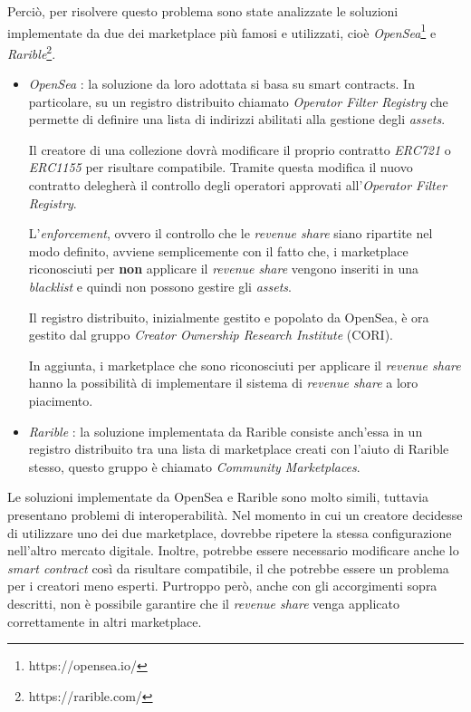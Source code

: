 Perciò, per risolvere questo problema sono state analizzate le soluzioni implementate da due dei marketplace più famosi e utilizzati, cioè \textit{OpenSea}\footnote{https://opensea.io/} e \textit{Rarible}\footnote{https://rarible.com/}.

\begin{itemize}
    \item \textit{OpenSea} \cite{operator-filter-registry}: la soluzione da loro adottata si basa su smart contracts.
    In particolare, su un registro distribuito chiamato \textit{Operator Filter Registry} che permette di definire una lista di indirizzi abilitati alla gestione degli \textit{assets}. 

    Il creatore di una collezione dovrà modificare il proprio contratto  \textit{ERC721} o \textit{ERC1155} per risultare compatibile. Tramite questa modifica il nuovo contratto delegherà il controllo degli operatori approvati all'\textit{Operator Filter Registry}.

    L'\textit{enforcement}, ovvero il controllo che le \textit{revenue share} siano ripartite nel modo definito, avviene semplicemente con il fatto che, i marketplace riconosciuti per \textbf{non} applicare il \textit{revenue share} vengono inseriti in una \textit{blacklist} e quindi non possono gestire gli \textit{assets}.

    Il registro distribuito, inizialmente gestito e popolato da OpenSea, è ora gestito dal gruppo \textit{Creator Ownership Research Institute} (CORI).

    In aggiunta, i marketplace che sono riconosciuti per applicare il \textit{revenue share} hanno la possibilità di implementare il sistema di \textit{revenue share} a loro piacimento.
    \item \textit{Rarible} \cite{rarible-community-marketplaces}: la soluzione implementata da Rarible consiste anch'essa in un registro distribuito tra una lista di marketplace creati con l'aiuto di Rarible stesso, questo gruppo è chiamato \textit{Community Marketplaces}.
\end{itemize}

Le soluzioni implementate da OpenSea e Rarible sono molto simili, tuttavia presentano problemi di interoperabilità. Nel momento in cui un creatore decidesse di utilizzare uno dei due marketplace, dovrebbe ripetere la stessa configurazione nell'altro mercato digitale. Inoltre, potrebbe essere necessario modificare anche lo \textit{smart contract} così da risultare compatibile, il che potrebbe essere un problema per i creatori meno esperti. Purtroppo però, anche con gli accorgimenti sopra descritti, non è possibile garantire che il \textit{revenue share} venga applicato correttamente in altri marketplace.

